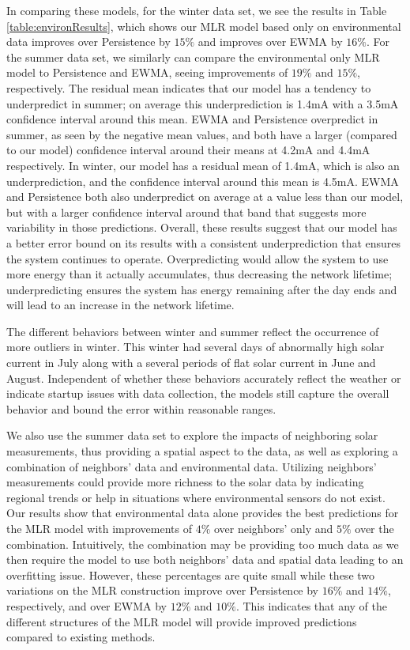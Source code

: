 \documentclass[prodmode,acmtosn]{acmsmall}
\begin{document}
In comparing these models, for the winter data set, we see the results in Table \ref{table:environResults}, which shows our MLR model based only on environmental data improves over Persistence by $15\%$ and improves over EWMA by $16\%$.
For the summer data set, we similarly can compare the environmental only MLR model to Persistence and EWMA, seeing improvements of $19\%$ and $15\%$, respectively.
The residual mean indicates that our model has a tendency to underpredict in summer; on average this underprediction is 1.4mA with a 3.5mA confidence interval around this mean.
EWMA and Persistence overpredict in summer, as seen by the negative mean values, and both have a larger (compared to our model) confidence interval around their means at 4.2mA and 4.4mA respectively.
In winter, our model has a residual mean of 1.4mA, which is also an underprediction, and the confidence interval around this mean is 4.5mA.
EWMA and Persistence both also underpredict on average at a value less than our model, but with a larger confidence interval around that band that suggests more variability in those predictions.
Overall, these results suggest that our model has a better error bound on its results with a consistent underprediction that ensures the system continues to operate.
Overpredicting would allow the system to use more energy than it actually accumulates, thus decreasing the network lifetime; underpredicting ensures the system has energy remaining after the day ends and will lead to an increase in the network lifetime.

The different behaviors between winter and summer reflect the occurrence of more outliers in winter.
This winter had several days of abnormally high solar current in July along with a several periods of flat solar current in June and August.
Independent of whether these behaviors accurately reflect the weather or indicate startup issues with data collection, the models still capture the overall behavior and bound the error within reasonable ranges.

We also use the summer data set to explore the impacts of neighboring solar measurements, thus providing a spatial aspect to the data, as well as exploring a combination of neighbors' data and environmental data.
Utilizing neighbors' measurements could provide more richness to the solar data by indicating regional trends or help in situations where environmental sensors do not exist.
Our results show that environmental data alone provides the best predictions for the MLR model with improvements of $4\%$ over neighbors' only and $5\%$ over the combination.
Intuitively, the combination may be providing too much data as we then require the model to use both neighbors' data and spatial  data leading to an overfitting issue.
However, these percentages are quite small while these two variations on the MLR construction improve over Persistence by $16\%$ and $14\%$, respectively, and over EWMA by $12\%$ and $10\%$.
This indicates that any of the different structures of the MLR model will provide  improved predictions compared to existing methods.
\end{document}

